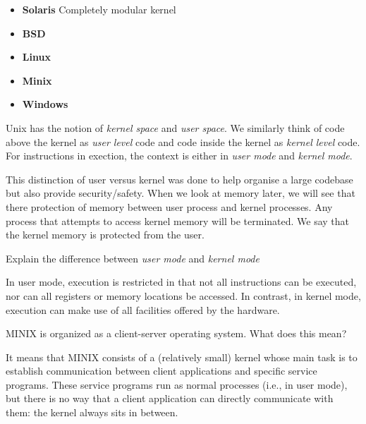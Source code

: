 \begin{itemize}   
\renewcommand{\labelitemi}{$\Box$}
\item \textbf{Solaris} 
Completely modular kernel
\item \textbf{BSD} 
\item \textbf{Linux} 
\item \textbf{Minix} 
\item \textbf{Windows} 
\end{itemize}

Unix has the notion of \textit{kernel space} and \textit{user space}. 
We similarly think of code above the kernel as \textit{user level} code and 
code inside the kernel as \textit{kernel level} code.
For instructions in exection, the context is either in 
\textit{user mode} and \textit{kernel mode}.

This distinction of user versus kernel
 was done to help organise a large codebase but also provide security/safety.
When we look at memory later, we will see that there protection of 
memory between user process and kernel processes. Any process that attempts to access 
kernel memory will be terminated. We say that the kernel memory is protected from the user. 

\begin{example}
Explain the difference between \textit{user mode} and \textit{kernel mode}

In user mode, execution is restricted in that not all instructions can be executed, nor can all registers or memory locations be accessed. In contrast, in kernel mode, execution can make use of all facilities offered by the hardware.
\end{example}


\begin{example}
MINIX is organized as a client-server operating system. What does this mean?

It means that MINIX consists of a (relatively small) kernel whose main task is to establish communication between client applications and speciﬁc service programs. These service programs run
as normal processes (i.e., in user mode), but there is no way that a client application can directly
communicate with them: the kernel always sits in between.
\end{example}



